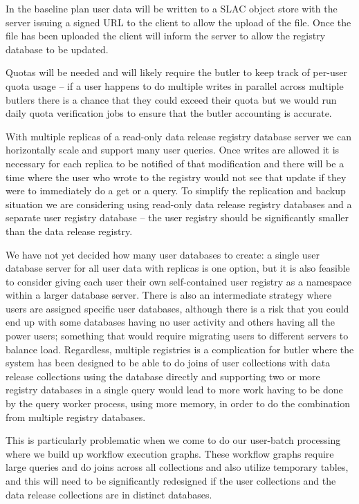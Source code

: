 In the baseline plan user data will be written to a SLAC object store with the server issuing a signed URL to the client to allow the upload of the file.
Once the file has been uploaded the client will inform the server to allow the registry database to be updated.

Quotas will be needed and will likely require the butler to keep track of per-user quota usage -- if a user happens to do multiple writes in parallel across multiple butlers there is a chance that they could exceed their quota but we would run daily quota verification jobs to ensure that the butler accounting is accurate.

With multiple replicas of a read-only data release registry database server we can horizontally scale and support many user queries.
Once writes are allowed it is necessary for each replica to be notified of that modification and there will be a time where the user who wrote to the registry would not see that update if they were to immediately do a get or a query.
To simplify the replication and backup situation we are considering using read-only data release registry databases and a separate user registry database -- the user registry should be significantly smaller than the data release registry.

We have not yet decided how many user databases to create: a single user database server for all user data with replicas is one option, but it is also feasible to consider giving each user their own self-contained user registry as a namespace within a larger database server.
There is also an intermediate strategy where users are assigned specific user databases, although there is a risk that you could end up with some databases having no user activity and others having all the power users; something that would require migrating users to different servers to balance load.
Regardless, multiple registries is a complication for butler where the system has been designed to be able to do joins of user collections with data release collections using the database directly and supporting two or more registry databases in a single query would lead to more work having to be done by the query worker process, using more memory, in order to do the combination from multiple registry databases.

This is particularly problematic when we come to do our user-batch processing where we build up workflow execution graphs.\cite{2022arXiv221115795G,2023arXiv230303313L}
These workflow graphs require large queries and do joins across all collections and also utilize temporary tables, and this will need to be significantly redesigned if the user collections and the data release collections are in distinct databases.

